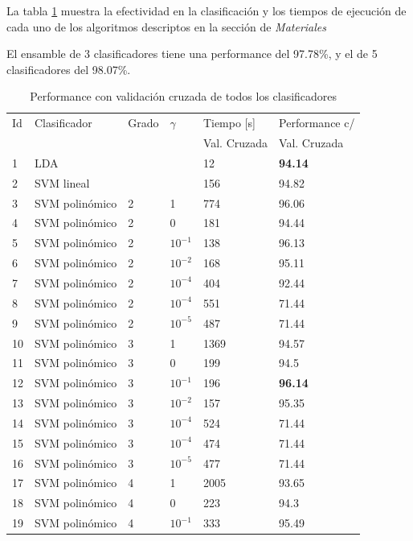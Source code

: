 \documentclass[journal]{IEEEtran}
\begin{document}
La tabla \ref{table:main_results} muestra la efectividad en la clasificación
y los tiempos de ejecución de cada uno de los algoritmos descriptos en
la sección de \textit{Materiales}

El ensamble de 3 clasificadores tiene una performance del 97.78\%, y el
de 5 clasificadores del 98.07\%.

\begin{table}[!hb]
\caption{Performance con validación cruzada de todos los clasificadores}
\label{table:main_results}
\centering
\begin{tabular}{l | l l l | l l}
	Id	&	Clasificador	&	Grado	&    $\gamma$	& Tiempo [s]  &	Performance c/ \\
	&			&		&		&	Val. Cruzada	& Val. Cruzada\\
\hline
	1	&	LDA	&		&		&	12	&	\textbf{94.14} \\
\hline
	2	&	SVM lineal 	&		&		&	156	&	94.82 \\
	3 	&	SVM polinómico 	&	2	&	1	&	774	&	96.06 \\
	4 	&	SVM polinómico 	&	2	&	0	&	181	&	94.44 \\
	5 	&	SVM polinómico 	&	2	&	 $ 10^{-1} $  	&	138	&	96.13 \\
	6 	&	SVM polinómico 	&	2	&	 $ 10^{-2} $  	&	168	&	95.11 \\
	7 	&	SVM polinómico 	&	2	&	$ 10^{-4} $	&	404	&	92.44 \\
	8 	&	SVM polinómico 	&	2	&	 $ 10^{-4} $  	&	551	&	71.44 \\
	9 	&	SVM polinómico 	&	2	&	 $ 10^{-5} $  	&	487	&	71.44 \\
	10	&	SVM polinómico 	&	3	&	1	&	1369	&	94.57 \\
	11	&	SVM polinómico 	&	3	&	0	&	199	&	94.5 \\
	12	&	SVM polinómico 	&	3	&	 $ 10^{-1} $  	&	196	&	\textbf{96.14} \\
	13	&	SVM polinómico 	&	3	&	 $ 10^{-2} $  	&	157	&	95.35 \\
	14	&	SVM polinómico 	&	3	&	$ 10^{-4} $	&	524	&	71.44 \\
	15	&	SVM polinómico 	&	3	&	 $ 10^{-4} $  	&	474	&	71.44 \\
	16	&	SVM polinómico 	&	3	&	 $ 10^{-5} $  	&	477	&	71.44 \\
	17	&	SVM polinómico 	&	4	&	1	&	2005	&	93.65 \\
	18	&	SVM polinómico 	&	4	&	0	&	223	&	94.3 \\
	19	&	SVM polinómico 	&	4	&	 $ 10^{-1} $  	&	333	&	95.49 \\

\end{tabular}
\end{table}
\end{document}
